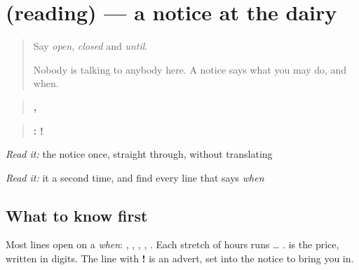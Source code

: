 \section[(reading)]{(reading) — a notice at the dairy}

\label{lesson:MW-C164-dairy-notice}



\begin{quote}
Say \emph{open}, \emph{closed} and \emph{until}.

Nobody is talking to anybody here. A notice says what you may do, and when.
\end{quote}

\begin{tcolorbox}[breakable,skin=enhanced,colback=orange!6,colframe=orange!45!black,boxrule=0.5pt,arc=1mm,left=6pt,right=6pt,top=4pt,bottom=4pt,fonttitle=\bfseries,title={Read this}]
\begin{quote}
\textbf{,   }
\end{quote}

\begin{quote}
\textbf{        } \textbf{       } \textbf{        } \textbf{     } \textbf{   } \textbf{:  } \textbf{  } \textbf{   !} \textbf{}
\end{quote}

\emph{Read it:} the notice once, straight through, without translating

\emph{Read it:} it a second time, and find every line that says \emph{when}
\end{tcolorbox}

\subsection*{What to know first}
Most lines open on a \emph{when}: \textbf{}, \textbf{}, \textbf{}, \textbf{}, \textbf{}. Each stretch of hours runs \textbf{} … \textbf{}. \textbf{} is the price, written in digits. The line with \textbf{!} is an advert, set into the notice to bring you in.

